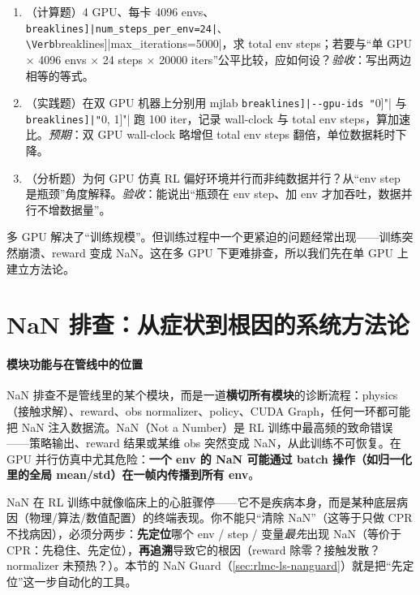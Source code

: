 \begin{practice}
\begin{enumerate}
\item （计算题）4 GPU、每卡 4096 envs、\Verb[breaklines]|num_steps_per_env=24|、\Verb[breaklines]|max_iterations=5000|，求 total env steps；若要与“单 GPU $\times$ 4096 envs $\times$ 24 steps $\times$ 20000 iters”公平比较，应如何设？\emph{验收}：写出两边相等的等式。
\item （实践题）在双 GPU 机器上分别用 mjlab \Verb[breaklines]|--gpu-ids "[0]"| 与 \Verb[breaklines]|"[0, 1]"| 跑 100 iter，记录 wall-clock 与 total env steps，算加速比。\emph{预期}：双 GPU wall-clock 略增但 total env steps 翻倍，单位数据耗时下降。
\item （分析题）为何 GPU 仿真 RL 偏好环境并行而非纯数据并行？从“env step 是瓶颈”角度解释。\emph{验收}：能说出“瓶颈在 env step、加 env 才加吞吐，数据并行不增数据量”。
\end{enumerate}
\end{practice}

多 GPU 解决了“训练规模”。但训练过程中一个更紧迫的问题经常出现——训练突然崩溃、reward 变成 NaN。这在多 GPU 下更难排查，所以我们先在单 GPU 上建立方法论。

\section{NaN 排查：从症状到根因的系统方法论}
\label{sec:rlmc-ls-nan}

\paragraph{\texorpdfstring{ 模块功能与在管线中的位置}{1 模块功能与在管线中的位置}}NaN 排查不是管线里的某个模块，而是一道\textbf{横切所有模块}的诊断流程：physics（接触求解）、reward、obs normalizer、policy、CUDA Graph，任何一环都可能把 NaN 注入数据流。NaN（Not a Number）是 RL 训练中最高频的致命错误——策略输出、reward 结果或某维 obs 突然变成 NaN，从此训练不可恢复。在 GPU 并行仿真中尤其危险：\textbf{一个 env 的 NaN 可能通过 batch 操作（如归一化里的全局 mean/std）在一帧内传播到所有 env}。

\begin{insight}\label{ins:rlmc-ls-nan-cpr}
NaN 在 RL 训练中就像临床上的心脏骤停——它不是疾病本身，而是某种底层病因（物理/算法/数值配置）的终端表现。你不能只“清除 NaN”（这等于只做 CPR 不找病因），必须分两步：\textbf{先定位}哪个 env / step / 变量\emph{最先}出现 NaN（等价于 CPR：先稳住、先定位），\textbf{再追溯}导致它的根因（reward 除零？接触发散？normalizer 未预热？）。本节的 NaN Guard（\cref{sec:rlmc-ls-nanguard}）就是把“先定位”这一步自动化的工具。
\end{insight}

